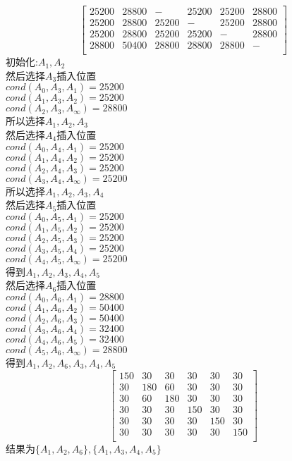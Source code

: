 \documentclass{article}
\begin{document}
\begin{CJK}{UTF8}{gbsn}
\begin{equation*}
\begin{bmatrix}
	25200&28800&-&25200&25200&28800\\	
	25200&28800&25200&-&25200&28800\\	
	25200&28800&25200&25200&-&28800\\	
	28800&50400&28800&28800&28800&-\\	
	\end{bmatrix}
	\end{equation*}
	初始化:$A_1,A_2$\\
	然后选择$A_3$插入位置\\
	$cond(A_0,A_3,A_1)=25200$\\
	$cond(A_1,A_3,A_2)=25200$\\
	$cond(A_2,A_3,A_\infty)=28800$\\
	所以选择$A_1,A_2,A_3$\\
	然后选择$A_4$插入位置\\
	$cond(A_0,A_4,A_1)=25200$\\
	$cond(A_1,A_4,A_2)=25200$\\
	$cond(A_2,A_4,A_3)=25200$\\
	$cond(A_3,A_4,A_\infty)=25200$\\
	所以选择$A_1,A_2,A_3,A_4$\\
	然后选择$A_5$插入位置\\
	$cond(A_0,A_5,A_1)=25200$\\
	$cond(A_1,A_5,A_2)=25200$\\
	$cond(A_2,A_5,A_3)=25200$\\
	$cond(A_3,A_5,A_4)=25200$\\
	$cond(A_4,A_5,A_\infty)=25200$\\
	得到$A_1,A_2,A_3,A_4,A_5$\\
	然后选择$A_6$插入位置\\
	$cond(A_0,A_6,A_1)=28800$\\
	$cond(A_1,A_6,A_2)=50400$\\
	$cond(A_2,A_6,A_3)=50400$\\
	$cond(A_3,A_6,A_4)=32400$\\
	$cond(A_4,A_6,A_5)=32400$\\
	$cond(A_5,A_6,A_\infty)=28800$\\
	得到$A_1,A_2,A_6,A_3,A_4,A_5$\\
	\begin{equation*}
	\begin{bmatrix}
	150&30&30&30&30&30\\
	30&180&60&30&30&30\\	
	30&60&180&30&30&30\\	
	30&30&30&150&30&30\\	
	30&30&30&30&150&30\\	
	30&30&30&30&30&150\\		
	\end{bmatrix}
	\end{equation*}
	结果为$\{A_1,A_2,A_6\},\{A_1,A_3,A_4,A_5\}$\\
	
	\end{CJK}
\end{document}
